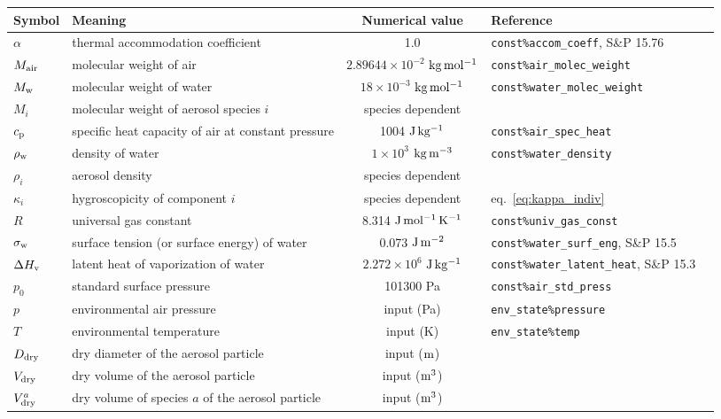 \documentclass{article}
\begin{document}
\begin{tabular}{lp{4cm}clp{3cm}}
\hline Symbol & Meaning  & Numerical value &  Reference    \\
\hline             
$\alpha$   &  thermal accommodation coefficient    & 1.0 & \verb+const%accom_coeff+, S\&P 15.76 \\
$M_{\rm air} $      &  molecular weight of air      & $2.89644 \times 10^{-2} $  $\rm{kg \,mol^{-1}}$ &  \verb+const%air_molec_weight+   \\
$M_{\rm w} $    &  molecular weight of water        & $18\times10^{-3}$ $\rm{kg \, mol^{-1}}  $  &  \verb+const%water_molec_weight+    \\
$M_i $      &  molecular weight of aerosol species $i$  & species dependent &    \\
$c_{\rm p}$       &  specific heat capacity of air at constant pressure  & 1004 $\rm{J \, kg^{-1}}$ & \verb+const%air_spec_heat+     \\
$\rho_{\rm w}$ &  density of water & $1\times10^{3}$ $\rm{kg \, m^{-3}}  $ &   \verb+const%water_density+ \\ 
$ \rho_i$    &  aerosol density   & species dependent  &     \\
$\kappa_i$      &  hygroscopicity of component $i$   & species dependent  &  eq.~\ref{eq:kappa_indiv}   \\
$R$     &  universal gas constant  & 8.314 $\rm{J \, mol^{-1}\, K^{-1}}$   &  \verb+const%univ_gas_const+ \\
$\sigma_{\rm w}$     &  surface tension (or surface energy) of water  & 0.073 $\rm{J \, m^{-2}}$ & \verb+const%water_surf_eng+, S\&P 15.5  \\
$\Delta H_{\rm  v}$  & latent heat of vaporization of water   & $2.272\times10^{6}$ $\rm{J \, kg^{-1}}$ & \verb+const%water_latent_heat+, S\&P 15.3 \\ 
$p_0$ & standard surface pressure &  101300 Pa & \verb+const%air_std_press+ \\
$p$     &  environmental air pressure & input  (Pa) &  \verb+env_state%pressure+ \\
$T$     &  environmental temperature  & input  (K) &  \verb+env_state%temp+  \\
$D_{\rm dry}$       & dry diameter of the aerosol particle   & input ($\rm m$) &    \\
$V_{\rm dry}$       & dry volume of the aerosol particle   & input ($\rm m^3$) &    \\
$V^a_{\rm dry}$       & dry volume of species $a$ of the aerosol particle   & input ($\rm m^3$) &    \\

\end{tabular}
\end{document}
